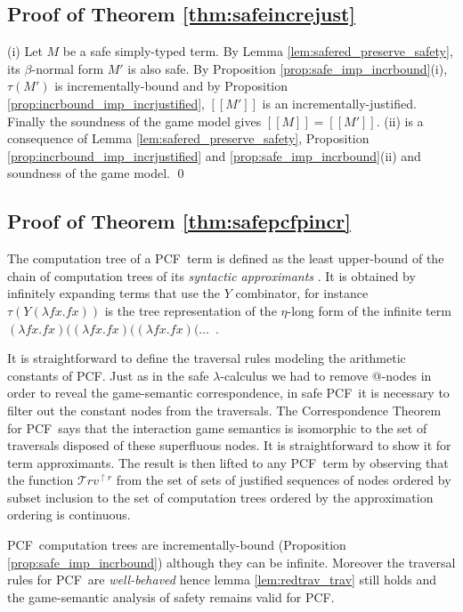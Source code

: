 \documentclass{llncs}
\newcommand\travset{\mathcal{T}rv}
\newcommand{\sem}[1]{{[\![ #1 ]\!]}}
\newcommand\pcf{\textsf{PCF}}
\begin{document}
\subsection{Proof of Theorem \ref{thm:safeincrejust}}
(i) Let $M$ be a safe simply-typed term. By Lemma
\ref{lem:safered_preserve_safety}, its $\beta$-normal form $M'$ is
also safe. By Proposition \ref{prop:safe_imp_incrbound}(i), $\tau(M')$
is incrementally-bound and by Proposition
\ref{prop:incrbound_imp_incrjustified}, $\sem{M'}$ is an
incrementally-justified. Finally the soundness of the game model gives
$\sem{M} = \sem{M'}$.  (ii) is a consequence of Lemma
\ref{lem:safered_preserve_safety}, Proposition
\ref{prop:incrbound_imp_incrjustified} and
\ref{prop:safe_imp_incrbound}(ii) and soundness of the game model.
\qed

\subsection{Proof of Theorem \ref{thm:safepcfpincr}}

The computation tree of a \pcf\ term is defined as the least
upper-bound of the chain of computation trees of its \emph{syntactic
  approximants} \cite{abramsky:game-semantics-tutorial}.  It is
obtained by infinitely expanding terms that use the $Y$ combinator,
for instance $\tau(Y (\lambda f x. f x))$ is the tree representation
of the $\eta$-long form of the infinite term $(\lambda f x. f x)
((\lambda f x. f x) ((\lambda f x. f x) ( \ldots$\ .


It is straightforward to define the traversal rules modeling the
arithmetic constants of \pcf. Just as in the safe $\lambda$-calculus
we had to remove @-nodes in order to reveal the game-semantic
correspondence, in safe \pcf\ it is necessary to filter out the
constant nodes from the traversals. The Correspondence Theorem for
\pcf\ says that the interaction game semantics is isomorphic to the
set of traversals disposed of these superfluous nodes. It is
straightforward to show it for term approximants. The result is then
lifted to any \pcf\ term by observing that the function
$\travset^{\upharpoonright r}$ from the set of sets of justified
sequences of nodes ordered by subset inclusion to the set of
computation trees ordered by the approximation ordering is continuous.

\pcf\ computation trees are incrementally-bound (Proposition
\ref{prop:safe_imp_incrbound}) although they can be infinite.
Moreover the traversal rules for \pcf\ are \emph{well-behaved} hence
lemma \ref{lem:redtrav_trav} still holds and the game-semantic
analysis of safety remains valid for \pcf.
\end{document}
